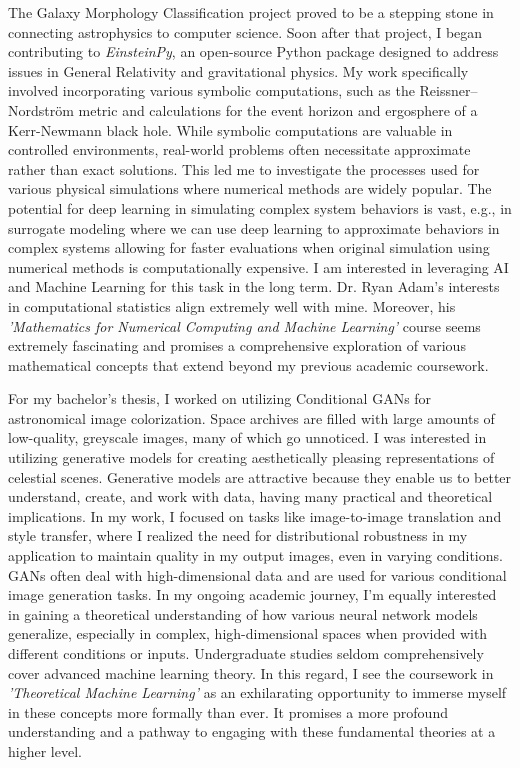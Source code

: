 \documentclass{article}
\begin{document}
The Galaxy Morphology Classification project proved to be a stepping stone in
connecting astrophysics to computer science. Soon after that project, I began
contributing to \textit{EinsteinPy}, an open-source Python package designed to address
issues in General Relativity and gravitational physics. My work specifically
involved incorporating various symbolic computations, such as the
Reissner–Nordström metric and calculations for the event horizon and ergosphere
of a Kerr-Newmann black hole. While symbolic computations are valuable in
controlled environments, real-world problems often necessitate approximate
rather than exact solutions. This led me to investigate the processes used for
various physical simulations where numerical methods are widely popular. The
potential for deep learning in simulating complex system behaviors is vast,
e.g., in surrogate modeling where we can use deep learning to approximate
behaviors in complex systems allowing for faster evaluations when original
simulation using numerical methods is computationally expensive. I am interested
in leveraging AI and Machine Learning for this task in the long term. Dr.
Ryan Adam's interests in computational statistics align extremely well with
mine. Moreover, his \textit{'Mathematics for Numerical Computing and Machine
Learning'} course seems extremely fascinating and promises a comprehensive exploration of
various mathematical concepts that extend beyond my previous academic
coursework. 

For my bachelor’s thesis, I worked on utilizing Conditional GANs for
astronomical image colorization. Space archives are filled with large amounts of
low-quality, greyscale images, many of which go unnoticed. I was interested in
utilizing generative models for creating aesthetically pleasing representations
of celestial scenes. Generative models are attractive because they enable us to
better understand, create, and work with data, having many practical and
theoretical implications. In my work, I focused on tasks like image-to-image
translation and style transfer, where I realized the need for distributional
robustness in my application to maintain quality in my output images, even in
varying conditions. GANs often deal with high-dimensional data and are used for
various conditional image generation tasks. In my ongoing academic journey, I’m
equally interested in gaining a theoretical understanding of how various neural
network models generalize, especially in complex, high-dimensional spaces when
provided with different conditions or inputs. Undergraduate studies seldom
comprehensively cover advanced machine learning theory. In this regard, I see
the coursework in \textit{'Theoretical Machine Learning'} as an exhilarating opportunity
to immerse myself in these concepts more formally than ever. It promises a more
profound understanding and a pathway to engaging with these fundamental theories
at a higher level.
\end{document}
